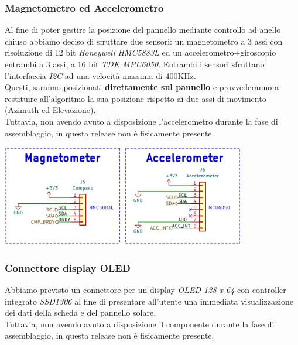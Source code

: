 \hypertarget{magnetometro-ed-accelerometro}{%
\subsubsection{\texorpdfstring{Magnetometro ed Accelerometro}{Magnetometro ed Accelerometro}}\label{magnetometro-ed-accelerometro}}

Al fine di poter gestire la posizione del pannello mediante controllo ad
anello chiuso abbiamo deciso di sfruttare due sensori: un magnetometro a
3 assi con risoluzione di 12 bit \emph{Honeywell} \emph{HMC5883L} ed un
accelerometro+giroscopio entrambi a 3 assi, a 16 bit \emph{TDK}
\emph{MPU6050}. Entrambi i sensori sfruttano l'interfaccia \emph{I2C} 
ad una velocità massima di 400KHz.\\
Questi, saranno posizionati \textbf{direttamente sul pannello} e
provvederanno a restituire all'algoritmo la sua posizione
rispetto ai due assi di movimento (Azimuth ed Elevazione).\\
Tuttavia, non avendo avuto a disposizione l'accelerometro durante la
fase di assemblaggio, in questa release non è fisicamente presente.

\begin{center}
\includegraphics[width=0.8\textwidth]{figures/image31.png}
\captionsetup{type=figure}
\end{center}

\hypertarget{connettore-display-oled}{%
\subsubsection{\texorpdfstring{Connettore display OLED}{Connettore display OLED }}\label{connettore-display-oled}}

Abbiamo previsto un connettore per un display \emph{OLED 128 x 64} con
controller integrato \emph{SSD1306} al fine di presentare all'utente una
immediata visualizzazione dei dati della scheda e del pannello solare.\\
Tuttavia, non avendo avuto a disposizione il componente durante la fase
di assemblaggio, in questa release non è fisicamente presente.

